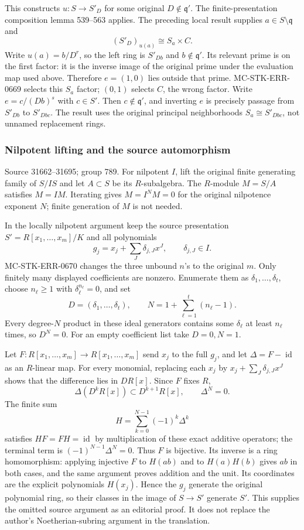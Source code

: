 This constructs \(u:S\to S'_D\) for some original \(D\notin\mathfrak q'\). The finite-presentation composition lemma 539--563 applies. The preceding local result supplies \(a\in S\setminus\mathfrak q\) and \[
(S'_D)_{u(a)}\cong S_a\times C.
\] Write \(u(a)=b/D^r\), so the left ring is \(S'_{Db}\) and \(b\notin\mathfrak q'\). Its relevant prime is on the first factor: it is the inverse image of the original prime under the evaluation map used above. Therefore \(e=(1,0)\) lies outside that prime. MC-STK-ERR-0669 selects this \(S_a\) factor; \((0,1)\) selects \(C\), the wrong factor. Write \(e=c/(Db)^s\) with \(c\in S'\). Then \(c\notin\mathfrak q'\), and inverting \(e\) is precisely passage from \(S'_{Db}\) to \(S'_{Dbc}\). The result uses the original principal neighborhoods \(S_a\cong S'_{Dbc}\), not unnamed replacement rings.

\subsubsection{Nilpotent lifting and the source automorphism}\label{nilpotent-lifting-and-the-source-automorphism}

Source 31662--31695; group 789. For nilpotent \(I\), lift the original finite generating family of \(S/IS\) and let \(A\subset S\) be its \(R\)-subalgebra. The \(R\)-module \(M=S/A\) satisfies \(M=IM\). Iterating gives \(M=I^NM=0\) for the original nilpotence exponent \(N\); finite generation of \(M\) is not needed.

In the locally nilpotent argument keep the source presentation \(S'=R[x_1,\ldots,x_m]/K\) and all polynomials \[
g_j=x_j+\sum_J\delta_{j,J}x^J,\qquad \delta_{j,J}\in I.
\] MC-STK-ERR-0670 changes the three unbound \(n\)'s to the original \(m\). Only finitely many displayed coefficients are nonzero. Enumerate them as \(\delta_1,\ldots,\delta_t\), choose \(n_\ell\ge1\) with \(\delta_\ell^{n_\ell}=0\), and set \[
D=(\delta_1,\ldots,\delta_t),\qquad N=1+\sum_{\ell=1}^t(n_\ell-1).
\] Every degree-\(N\) product in these ideal generators contains some \(\delta_\ell\) at least \(n_\ell\) times, so \(D^N=0\). For an empty coefficient list take \(D=0,N=1\).

Let \(F:R[x_1,\ldots,x_m]\to R[x_1,\ldots,x_m]\) send \(x_j\) to the full \(g_j\), and let \(\Delta=F-\operatorname{id}\) as an \(R\)-linear map. For every monomial, replacing each \(x_j\) by \(x_j+\sum_J\delta_{j,J}x^J\) shows that the difference lies in \(D R[x]\). Since \(F\) fixes \(R\), \[
\Delta(D^kR[x])\subset D^{k+1}R[x],\qquad \Delta^N=0.
\] The finite sum \[
H=\sum_{k=0}^{N-1}(-1)^k\Delta^k
\] satisfies \(HF=FH=\operatorname{id}\) by multiplication of these exact additive operators; the terminal term is \((-1)^{N-1}\Delta^N=0\). Thus \(F\) is bijective. Its inverse is a ring homomorphism: applying injective \(F\) to \(H(ab)\) and to \(H(a)H(b)\) gives \(ab\) in both cases, and the same argument proves addition and the unit. Its coordinates are the explicit polynomials \(H(x_j)\). Hence the \(g_j\) generate the original polynomial ring, so their classes in the image of \(S\to S'\) generate \(S'\). This supplies the omitted source argument as an editorial proof. It does not replace the author's Noetherian-subring argument in the translation.


